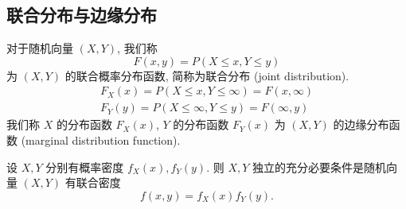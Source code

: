 \subsection{联合分布与边缘分布}
对于随机向量 $(X, Y)$, 我们称
$$
    F(x, y)=P(X \leq x, Y \leq y)
$$
为 $(X, Y)$ 的联合概率分布函数, 简称为联合分布 (joint distribution).
$$
    \begin{gathered}
        F_X(x)=P(X \leq x, Y \leq \infty)=F(x, \infty) \\
        F_Y(y)=P(X \leq \infty, Y \leq y)=F(\infty, y)
    \end{gathered}
$$
我们称 $X$ 的分布函数 $F_X(x)$, $Y$ 的分布函数 $F_Y(x)$ 为 $(X, Y)$ 的边缘分布函数 (marginal distribution function).

\begin{theorem}
    设 $X, Y$ 分别有概率密度 $f_X(x), f_Y(y)$. 则 $X, Y$ 独立的充分必要条件是随机向量 $(X, Y)$ 有联合密度
    $$
        f(x, y)=f_X(x) f_Y(y) .
    $$
\end{theorem}

